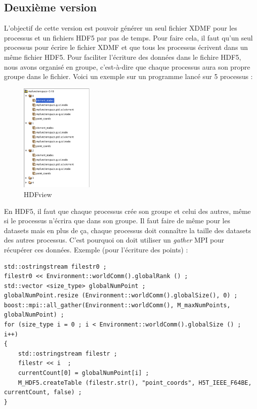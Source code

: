 \documentclass[12pt]{article}
\begin{document}
\subsection {Deuxième version}
L'objectif de cette version est pouvoir générer un seul fichier XDMF pour les processus et un fichiers HDF5 par pas de temps. Pour faire cela, il faut qu'un seul processus pour écrire le fichier XDMF et que tous les processus écrivent dans un même fichier HDF5.\newline
Pour faciliter l'écriture des données dans le fichire HDF5, nous avons organisé en groupe, c'est-à-dire que chaque processus aura son propre groupe dans le fichier.\newline
Voici un exemple sur un programme lancé sur 5 processus :
\begin {figure}[!h]
\begin {center}
\includegraphics [width = 100pt] {HDFview5.png}
\caption {HDFview}
\end {center}
\end {figure}
\newpage
En HDF5, il faut que chaque processus crée son groupe et celui des autres, même si le processus n'écrira que dans son groupe. Il faut faire de même pour les datasets mais en plus de ça, chaque processus doit connaître la taille des datasets des autres processus. C'est pourquoi on doit utiliser un \emph{gather} MPI pour récupérer ces données.\newline
Exemple (pour l'écriture des points) :\newline
\begin{lstlisting}
std::ostringstream filestr0 ;
filestr0 << Environment::worldComm().globalRank () ;
std::vector <size_type> globalNumPoint ;
globalNumPoint.resize (Environment::worldComm().globalSize(), 0) ;
boost::mpi::all_gather(Environment::worldComm(), M_maxNumPoints, globalNumPoint) ;
for (size_type i = 0 ; i < Environment::worldComm().globalSize () ; i++)
{
    std::ostringstream filestr ;
    filestr << i  ;
    currentCount[0] = globalNumPoint[i] ;
    M_HDF5.createTable (filestr.str(), "point_coords", H5T_IEEE_F64BE, currentCount, false) ;
}
\end{lstlisting}
\end{document}
